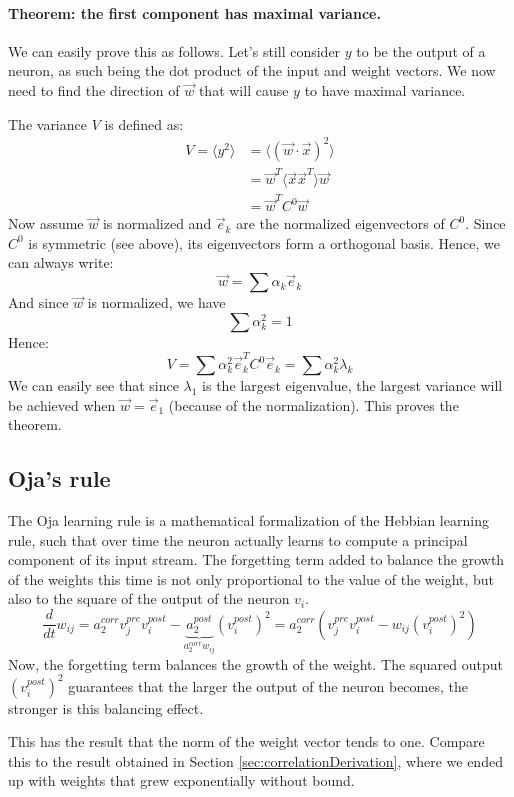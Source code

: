 \documentclass[11pt]{article}
\begin{document}
\paragraph{Theorem: the first component has maximal variance.}
We can easily prove this as follows. Let's still consider $y$ to be the output of a neuron, as such being the dot product of the input and weight vectors. We now need to find the direction of $\vec{w}$ that will cause $y$ to have maximal variance.

The variance $V$ is defined as:
\begin{align*}
V = \langle y^2 \rangle &= \langle (\vec{w}\cdot\vec{x})^2\rangle \\
&=\vec{w}^T \langle\vec{x}\vec{x}^T\rangle\vec{w} \\
&= \vec{w}^T C^0 \vec{w}
\end{align*} 
Now assume $\vec{w}$ is normalized and $\vec{e}_k$ are the normalized eigenvectors of $C^0$. Since $C^0$ is symmetric (see above), its eigenvectors form a orthogonal basis. Hence, we can always write:
\[\vec{w} = \sum \alpha_k \vec{e}_k \]
And since $\vec{w}$ is normalized, we have
\[\sum \alpha_k^2 = 1\]
Hence:
\[ V = \sum \alpha_k^2\vec{e}_k^T C^0 \vec{e}_k = \sum \alpha_k^2\lambda_k\]
We can easily see that since $\lambda_1$ is the largest eigenvalue, the largest variance will be achieved when $\vec{w} = \vec{e}_1$ (because of the normalization). This proves the theorem.

\subsection{Oja's rule}
The Oja learning rule is a mathematical formalization of the Hebbian learning rule, such that over time the neuron actually learns to compute a principal component of its input stream. The forgetting term added to balance the growth of the weights this time is not only proportional to the value of the weight, but also to the square of the output of the neuron $v_i$.
\[
\frac{d}{dt}w_{ij}=a_2^{corr}v_j^{pre}v_i^{post}-\underbrace{a_2^{post}}_{a_2^{corr}w_{ij}}(v_i^{post})^2=a_2^{corr}(v_j^{pre}v_i^{post}-w_{ij}(v_i^{post})^2)
\]
Now, the forgetting term balances the growth of the weight. The squared output $(v_i^{post})^2$ guarantees that the larger the output of the neuron becomes, the stronger is this balancing effect.

This has the result that the norm of the weight vector tends to one. Compare this to the result obtained in Section \ref{sec:correlationDerivation}, where we ended up with weights that grew exponentially without bound.
\end{document}
